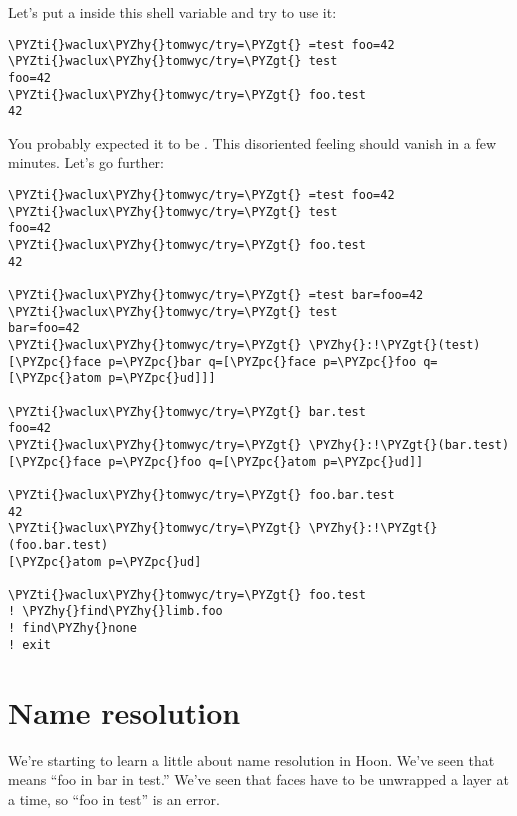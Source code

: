Let's put a  inside this shell variable and try to use it:

\begin{framed_shaded}
\begin{Verbatim}[fontsize=\relsize{-2.5},fontseries=b,commandchars=\\\{\}]
\PYZti{}waclux\PYZhy{}tomwyc/try=\PYZgt{} =test foo=42
\PYZti{}waclux\PYZhy{}tomwyc/try=\PYZgt{} test
foo=42
\PYZti{}waclux\PYZhy{}tomwyc/try=\PYZgt{} foo.test
42
\end{Verbatim}
\end{framed_shaded}
You probably expected it to be .  This disoriented
feeling should vanish in a few minutes.  Let's go further:

\begin{framed_shaded}
\begin{Verbatim}[fontsize=\relsize{-2.5},fontseries=b,commandchars=\\\{\}]
\PYZti{}waclux\PYZhy{}tomwyc/try=\PYZgt{} =test foo=42
\PYZti{}waclux\PYZhy{}tomwyc/try=\PYZgt{} test
foo=42
\PYZti{}waclux\PYZhy{}tomwyc/try=\PYZgt{} foo.test
42

\PYZti{}waclux\PYZhy{}tomwyc/try=\PYZgt{} =test bar=foo=42
\PYZti{}waclux\PYZhy{}tomwyc/try=\PYZgt{} test
bar=foo=42
\PYZti{}waclux\PYZhy{}tomwyc/try=\PYZgt{} \PYZhy{}:!\PYZgt{}(test)
[\PYZpc{}face p=\PYZpc{}bar q=[\PYZpc{}face p=\PYZpc{}foo q=[\PYZpc{}atom p=\PYZpc{}ud]]]

\PYZti{}waclux\PYZhy{}tomwyc/try=\PYZgt{} bar.test
foo=42
\PYZti{}waclux\PYZhy{}tomwyc/try=\PYZgt{} \PYZhy{}:!\PYZgt{}(bar.test)
[\PYZpc{}face p=\PYZpc{}foo q=[\PYZpc{}atom p=\PYZpc{}ud]]

\PYZti{}waclux\PYZhy{}tomwyc/try=\PYZgt{} foo.bar.test
42
\PYZti{}waclux\PYZhy{}tomwyc/try=\PYZgt{} \PYZhy{}:!\PYZgt{}(foo.bar.test)
[\PYZpc{}atom p=\PYZpc{}ud]

\PYZti{}waclux\PYZhy{}tomwyc/try=\PYZgt{} foo.test
! \PYZhy{}find\PYZhy{}limb.foo
! find\PYZhy{}none
! exit
\end{Verbatim}
\end{framed_shaded}

\section{Name resolution}

We're starting to learn a little about name resolution in Hoon.
We've seen that  means ``foo in bar in test.''  We've
seen that faces have to be unwrapped a layer at a time, so ``foo in
test'' is an error.

